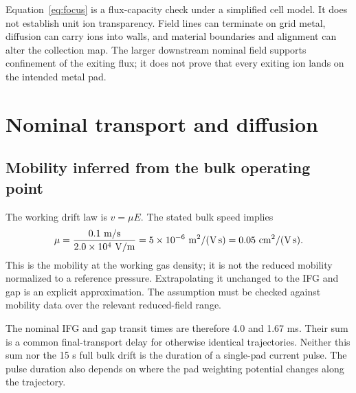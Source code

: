 \documentclass[11pt,a4paper]{article}
\begin{document}
Equation~\eqref{eq:focus} is a flux-capacity check under a simplified cell model.
It does not establish unit ion transparency. Field lines can terminate on grid
metal, diffusion can carry ions into walls, and material boundaries and alignment
can alter the collection map. The larger downstream nominal field supports
confinement of the exiting flux; it does not prove that every exiting ion lands
on the intended metal pad.

\section{Nominal transport and diffusion}
\subsection{Mobility inferred from the bulk operating point}
The working drift law is $v=\mu E$. The stated bulk speed implies
\begin{equation}
 \mu=\frac{0.1\ \mathrm{m/s}}{2.0\times10^4\ \mathrm{V/m}}
 =\Mobility\times10^{-6}\ \mathrm{m^2/(V\,s)}
 =0.05\ \mathrm{cm^2/(V\,s)}.
\end{equation}
This is the mobility at the working gas density; it is not the reduced mobility
normalized to a reference pressure. Extrapolating it unchanged to the IFG and
gap is an explicit approximation. The assumption must be checked against
mobility data over the relevant reduced-field range.

\begin{table}[ht]
\centering\small

\caption{Uniform-field estimates using the same mobility in each region.
Reduced fields use the design pressure of 15 bar. The bulk reference path is
1.5 m, whereas the hole and gap paths are 10 and 5 mm respectively.}
\label{tab:regions}
\end{table}

The nominal IFG and gap transit times are therefore 4.0 and 1.67 ms. Their sum
is a common final-transport delay for otherwise identical trajectories. Neither
this sum nor the 15 s full bulk drift is the duration of a single-pad current
pulse. The pulse duration also depends on where the pad weighting potential
changes along the trajectory.

\clearpage
\end{document}
